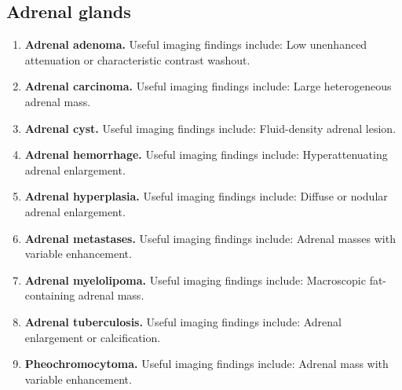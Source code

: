 \subsection{Adrenal glands}
\begin{enumerate}[leftmargin=*,itemsep=0.45em,topsep=0.4em]
\item \textbf{Adrenal adenoma.} Useful imaging findings include: Low unenhanced attenuation or characteristic contrast washout.
\item \textbf{Adrenal carcinoma.} Useful imaging findings include: Large heterogeneous adrenal mass.
\item \textbf{Adrenal cyst.} Useful imaging findings include: Fluid-density adrenal lesion.
\item \textbf{Adrenal hemorrhage.} Useful imaging findings include: Hyperattenuating adrenal enlargement.
\item \textbf{Adrenal hyperplasia.} Useful imaging findings include: Diffuse or nodular adrenal enlargement.
\item \textbf{Adrenal metastases.} Useful imaging findings include: Adrenal masses with variable enhancement.
\item \textbf{Adrenal myelolipoma.} Useful imaging findings include: Macroscopic fat-containing adrenal mass.
\item \textbf{Adrenal tuberculosis.} Useful imaging findings include: Adrenal enlargement or calcification.
\item \textbf{Pheochromocytoma.} Useful imaging findings include: Adrenal mass with variable enhancement.
\end{enumerate}

